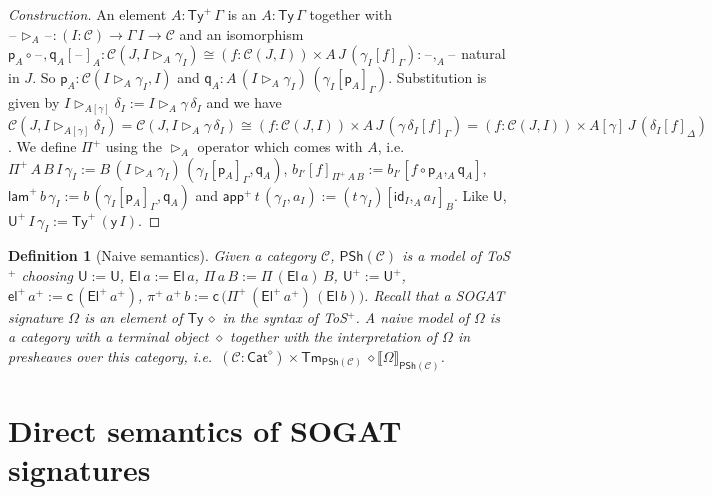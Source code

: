\documentclass[10pt,a4paper]{amsart}
\newtheorem{definition}[theorem]{Definition}
\newcommand{\Ty}{\mathsf{Ty}}
\newcommand{\Tm}{\mathsf{Tm}}
\newcommand{\U}{\mathsf{U}}
\newcommand{\El}{\mathsf{El}}
\newcommand{\ra}{\rightarrow}
\newcommand{\blank}{\mathord{\hspace{1pt}\text{--}\hspace{1pt}}} %
\newcommand{\lam}{\mathsf{lam}}
\newcommand{\app}{\mathsf{app}}
\newcommand{\el}{\mathsf{el}}
\newcommand{\ext}{\operatorname{\triangleright}}
\newcommand{\p}{\mathsf{p}}
\newcommand{\q}{\mathsf{q}}
\newcommand{\id}{\mathsf{id}}
\newcommand{\C}{\mathcal{C}}
\newcommand{\PSh}{\mathsf{PSh}}
\newcommand{\y}{\mathsf{y}}
\newcommand{\code}{\mathsf{c}}
\begin{document}
\begin{proof}[Construction]
  An element $A : \Ty^+\,\Gamma$ is an $A : \Ty\,\Gamma$ together with
  $\blank\ext_A\blank : (I:\C)\ra\Gamma\,I\ra\C$ and an isomorphism
  $\p_A\circ\blank,\q_A[\blank]_A : \C(J,I\ext_A\gamma_I) \cong
  (f:\C(J,I))\times A\,J\,(\gamma_I[f]_\Gamma) :
  \blank\mathbin{,_A}\blank$ natural in $J$. So
  $\p_A:\C(I\ext_A\gamma_I,I)$ and
  $\q_A:A\,(I\ext_A\gamma_I)\,(\gamma_I[\p_A]_\Gamma)$. Substitution
  is given by $I\ext_{A[\gamma]}\delta_I := I\ext_A\gamma\,\delta_I$
  and we have $\C(J,I\ext_{A[\gamma]}\delta_I) =
  \C(J,I\ext_A\gamma\,\delta_I) \cong (f:\C(J,I))\times
  A\,J\,(\gamma\,\delta_I[f]_\Gamma) = (f:\C(J,I))\times
  A[\gamma]\,J\,(\delta_I[f]_\Delta)$. We define $\Pi^+$ using the
  $\ext_A$ operator which comes with $A$,
  i.e.\ $\Pi^+\,A\,B\,I\,\gamma_I :=
  B\,(I\ext_A\gamma_I)\,(\gamma_I[\p_A]_\Gamma, \q_A)$,
  $b_{I'}[f]_{\Pi^+\,A\,B} := b_{I'}[f\circ\p_A\mathbin{,_A}\q_A]$,
  $\lam^+\,b\,\gamma_I := b\,(\gamma_I[\p_A]_\Gamma,\q_A)$ and
  $\app^+\,t\,(\gamma_I,a_I) :=
  (t\,\gamma_I)[\id_I\mathbin{,_A}a_I]_B$. Like $\U$,
  $\U^+\,I\,\gamma_I := \Ty^+\,(\y\,I)$.
\end{proof}
\begin{definition}[Naive semantics]\label{def:naive}
  Given a category $\C$, $\PSh(\C)$ is a model of ToS$^+$ choosing $\U := \U$, $\El\,a := \El\,a$, $\Pi\,a\,B :=
  \Pi\,(\El\,a)\,B$, $\U^+ := \U^+$, $\el^+\,a^+ :=
  \code\,(\El^+\,a^+)$, $\pi^+\,a^+\,b :=
  \code\,\big(\Pi^+\,(\El^+\,a^+)\,(\El\,b)\big)$. Recall that a SOGAT
  signature $\Omega$ is an element of $\Ty\,\diamond$ in the syntax of ToS$^+$.
  A naive model of $\Omega$ is a category with a
  terminal object $\diamond$ together with the interpretation of $\Omega$ in
  presheaves over this category, i.e.\ 
  $(\C:\mathsf{Cat}^\diamond)\times\Tm_{\PSh(\C)}\,\diamond\llbracket\Omega
  \rrbracket_{\PSh(\C)}$.
\end{definition}

\setcounter{theorem}{18}
\section{Direct semantics of SOGAT signatures}
\label{sec:warmup}
\end{document}

